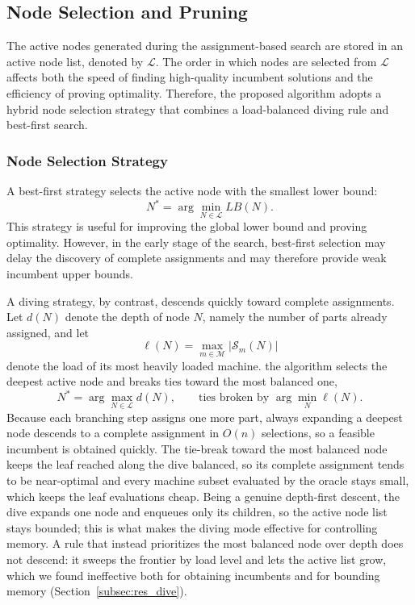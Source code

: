 \documentclass[letterpaper, 10 pt, conference]{ieeeconf}  %
\begin{document}
\subsection{Node Selection and Pruning}
\label{subsec:node_selection_pruning}

The active nodes generated during the assignment-based search are stored in
an active node list, denoted by $\mathcal{L}$. The order in which nodes are
selected from $\mathcal{L}$ affects both the speed of finding high-quality
incumbent solutions and the efficiency of proving optimality. Therefore,
the proposed algorithm adopts a hybrid node selection strategy that combines
a load-balanced diving rule and best-first search.

\subsubsection{Node Selection Strategy}

A best-first strategy selects the active node with the smallest lower bound:
\[
N^*=\arg\min_{N\in\mathcal{L}} LB(N).
\]
This strategy is useful for improving the global lower bound and proving
optimality. However, in the early stage of the search, best-first selection
may delay the discovery of complete assignments and may therefore provide
weak incumbent upper bounds.

A diving strategy, by contrast, descends quickly toward complete assignments.
Let $d(N)$ denote the depth of node $N$, namely the number of parts already
assigned, and let
\[
\ell(N)=\max_{m\in\mathcal{M}}\bigl|\mathcal{S}_m(N)\bigr|
\]
denote the load of its most heavily loaded machine. the algorithm selects the deepest active node and breaks ties toward the most
balanced one,
\[
N^*=\arg\max_{N\in\mathcal{L}} d(N),
\qquad\text{ties broken by }\arg\min_{N}\ell(N).
\]
Because each branching step assigns one more part, always expanding a deepest
node descends to a complete assignment in $O(n)$ selections, so a feasible
incumbent is obtained quickly. The tie-break toward the most balanced node keeps
the leaf reached along the dive balanced, so its complete assignment tends to be
near-optimal and every machine subset evaluated by the oracle stays small, which
keeps the leaf evaluations cheap. Being a genuine depth-first descent, the dive
expands one node and enqueues only its children, so the active node list stays
bounded; this is what makes the diving mode effective for controlling memory. A
rule that instead prioritizes the most balanced node over depth does not descend:
it sweeps the frontier by load level and lets the active list grow, which we
found ineffective both for obtaining incumbents and for bounding memory
(Section~\ref{subsec:res_dive}).
\end{document}

